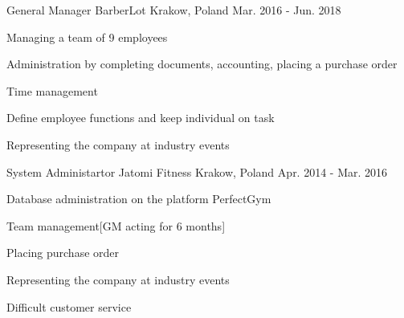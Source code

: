 \begin{cventries}
  \cventry
    {General Manager} %
    {BarberLot} %
    {Krakow, Poland} %
    {Mar. 2016 - Jun. 2018} %
    {
      \begin{cvitems} %
        \item {Managing a team of 9 employees}
        \item {Administration by completing documents, accounting, placing a purchase order}
        \item {Time management}
        \item {Define employee functions and keep individual on task}
        \item {Representing the company at industry events}
      \end{cvitems}
    }

  \cventry
    {System Administartor} %
    {Jatomi Fitness} %
    {Krakow, Poland} %
    {Apr. 2014 - Mar. 2016} %
    {
      \begin{cvitems} %
        \item {Database administration on the platform PerfectGym}
        \item {Team management[GM acting for 6 months]}
        \item{Placing purchase order}
        \item{Representing the company at industry events}
        \item{Difficult customer service}
      \end{cvitems}
    }

\end{cventries}
